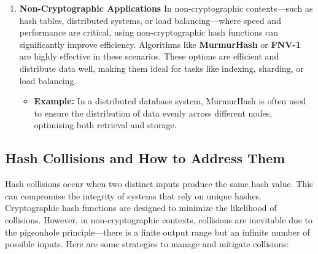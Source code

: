 \documentclass[11pt,a4paper]{article}
\begin{document}
\begin{enumerate}
\begin{itemize}
                \end{itemize}

            \item \textbf{Non-Cryptographic Applications} In non-cryptographic contexts—such as hash tables, distributed systems, or load balancing—where speed and performance are critical, using non-cryptographic hash functions can significantly improve efficiency. Algorithms like \textbf{MurmurHash} or \textbf{FNV-1} are highly effective in these scenarios. These options are efficient and distribute data well, making them ideal for tasks like indexing, sharding, or load balancing.
            \begin{itemize}
                \item \textbf{Example:} In a distributed database system, MurmurHash is often used to ensure the distribution of data evenly across different nodes, optimizing both retrieval and storage.


            \end{itemize}
        \end{enumerate}

    \subsection*{Hash Collisions and How to Address Them}
    Hash collisions occur when two distinct inputs produce the same hash value. This can compromise the integrity of systems that rely on unique hashes. Cryptographic hash functions are designed to minimize the likelihood of collisions. However, in non-cryptographic contexts, collisions are inevitable due to the pigeonhole principle—there is a finite output range but an infinite number of possible inputs. Here are some strategies to manage and mitigate collisions:
\end{document}
